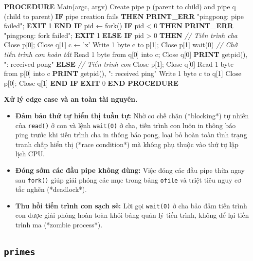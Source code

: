 \documentclass[12pt,a4paper]{article}
\newenvironment{algorithmblock}[1]{%
  \begin{tcolorbox}[
    enhanced,
    breakable,
    colback=white,
    colframe=primary!55,
    colbacktitle=primary,
    coltitle=white,
    boxrule=0.7pt,
    arc=2pt,
    left=10pt,right=10pt,top=7pt,bottom=8pt,
    title={#1},
    fonttitle=\small
  ]
}{%
  \end{tcolorbox}
}
\begin{document}
\begin{algorithmblock}{\texttt{pingpong}}
\begin{algorithmcode}
\textbf{PROCEDURE} Main(argc, argv)
    Create pipe p (parent to child) and pipe q (child to parent)
    \textbf{IF} pipe creation fails \textbf{THEN}
        \textbf{PRINT\_ERR} "pingpong: pipe failed"; \textbf{EXIT} 1
    \textbf{END IF}
    pid ← fork()
    \textbf{IF} pid < 0 \textbf{THEN}
        \textbf{PRINT\_ERR} "pingpong: fork failed"; \textbf{EXIT} 1
    \textbf{ELSE IF} pid > 0 \textbf{THEN} \textit{// Tiến trình cha}
        Close p[0]; Close q[1]
        c ← 'x'
        Write 1 byte c to p[1]; Close p[1]
        wait(0) \textit{// Chờ tiến trình con hoàn tất}
        Read 1 byte from q[0] into c; Close q[0]
        \textbf{PRINT} getpid(), ": received pong"
    \textbf{ELSE} \textit{// Tiến trình con}
        Close p[1]; Close q[0]
        Read 1 byte from p[0] into c
        \textbf{PRINT} getpid(), ": received ping"
        Write 1 byte c to q[1]
        Close p[0]; Close q[1]
    \textbf{END IF}
    \textbf{EXIT} 0
\textbf{END PROCEDURE}
\end{algorithmcode}
\end{algorithmblock}

\textbf{Xử lý edge case và an toàn tài nguyên.}
\begin{itemize}
  \item \textbf{Đảm bảo thứ tự hiển thị tuần tự:} Nhờ cơ chế chặn (*blocking*) tự nhiên của \texttt{read()} ở con và lệnh \texttt{wait(0)} ở cha, tiến trình con luôn in thông báo ping trước khi tiến trình cha in thông báo pong, loại bỏ hoàn toàn tình trạng tranh chấp hiển thị (*race condition*) mà không phụ thuộc vào thứ tự lập lịch CPU.
  \item \textbf{Đóng sớm các đầu pipe không dùng:} Việc đóng các đầu pipe thừa ngay sau \texttt{fork()} giúp giải phóng các mục trong bảng \texttt{ofile} và triệt tiêu nguy cơ tắc nghẽn (*deadlock*).
  \item \textbf{Thu hồi tiến trình con sạch sẽ:} Lời gọi \texttt{wait(0)} ở cha bảo đảm tiến trình con được giải phóng hoàn toàn khỏi bảng quản lý tiến trình, không để lại tiến trình ma (*zombie process*).
\end{itemize}

\subsection{\texttt{primes}}
\end{document}
